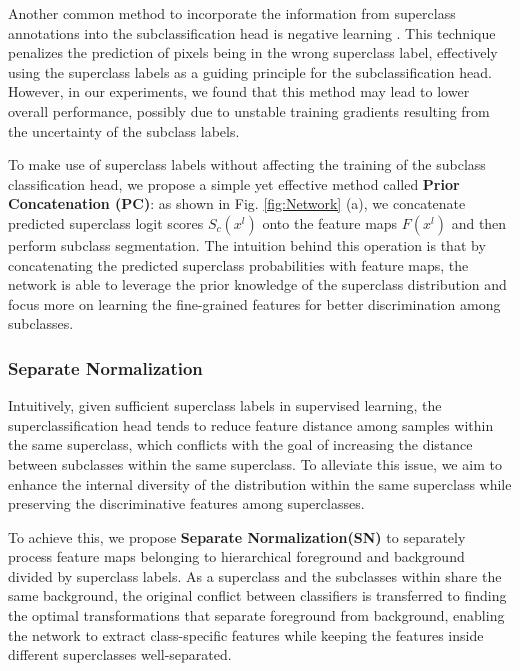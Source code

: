 \documentclass[runningheads]{llncs}
\begin{document}
\par Another common method to incorporate the information from superclass annotations into the subclassification head is negative learning \cite{kim2019nlnl}. This technique penalizes the prediction of pixels being in the wrong superclass label, effectively using the superclass labels as a guiding principle for the subclassification head. However, in our experiments, we found that this method may lead to lower overall performance, possibly due to unstable training gradients resulting from the uncertainty of the subclass labels. 
\par To make use of superclass labels without affecting the training of the subclass classification head, we propose a simple yet effective method called \textbf{Prior Concatenation (PC)}: as shown in Fig. \ref{fig:Network} (a), we concatenate predicted superclass logit scores $S_c(x^l)$ onto the feature maps $F(x^l)$ and then perform subclass segmentation. The intuition behind this operation is that by concatenating the predicted superclass probabilities with feature maps, the network is able to leverage the prior knowledge of the superclass distribution and focus more on learning the fine-grained features for better discrimination among subclasses.


\subsubsection{Separate Normalization}
\par Intuitively, 
given sufficient superclass labels in supervised learning, the superclassification head tends to reduce feature distance among samples within the same superclass, which conflicts with the goal of increasing the distance between subclasses within the same superclass. To alleviate this issue, we aim to enhance the internal diversity of the distribution within the same superclass while preserving the discriminative features among superclasses.

\par To achieve this, we propose \textbf{Separate Normalization(SN)} to separately process feature maps belonging to hierarchical foreground and background divided by superclass labels. As a superclass and the subclasses within share the same background, the original conflict between classifiers is transferred to finding the optimal transformations that separate foreground from background, enabling the network to extract class-specific features while keeping the features inside different superclasses well-separated. 
\end{document}
